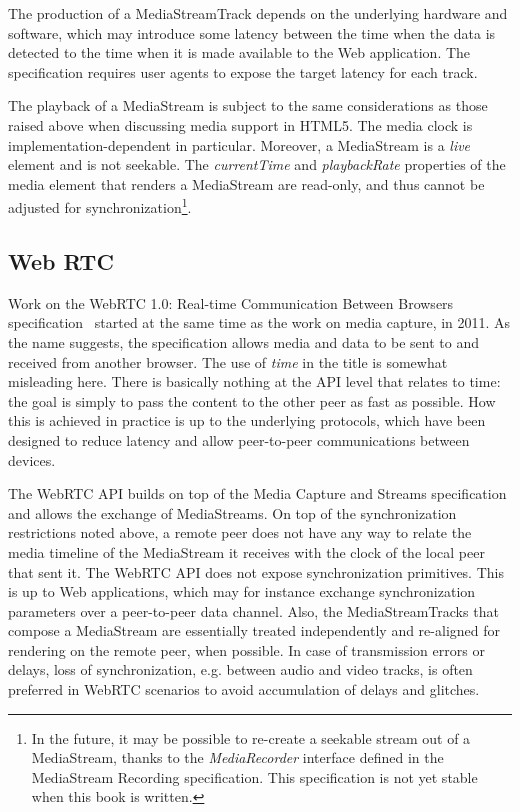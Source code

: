 The production of a MediaStreamTrack depends on the underlying hardware and
software, which may introduce some latency between the time when the data is
detected to the time when it is made available to the Web application. The
specification requires user agents to expose the target latency for each
track.

The playback of a MediaStream is subject to the same considerations as those
raised above when discussing media support in HTML5. The media clock is
implementation-dependent in particular. Moreover, a MediaStream is a
\emph{live} element and is not seekable. The \emph{currentTime} and
\emph{playbackRate} properties of the media element that renders a MediaStream
are read-only, and thus cannot be adjusted for synchronization\footnote{In the
future, it may be possible to re-create a seekable stream out of a
MediaStream, thanks to the \emph{MediaRecorder} interface defined in the
MediaStream Recording specification. This specification is not yet stable when
this book is written.}.


\subsection{Web RTC}
\label{sec:webrtc}

Work on the WebRTC 1.0: Real-time Communication Between Browsers
specification~\cite{webrtc}  started at the same time as the work on media
capture, in 2011. As the name suggests, the specification allows media and
data to be sent to and received from another browser. The use of \emph{time}
in the title is somewhat misleading here. There is basically nothing at the
API level that relates to time: the goal is simply to pass the content to the
other peer as fast as possible. How this is achieved in practice is up to the
underlying protocols, which have been designed to reduce latency and allow
peer-to-peer communications between devices.

The WebRTC API builds on top of the Media Capture and Streams specification
and allows the exchange of MediaStreams. On top of the synchronization
restrictions noted above, a remote peer does not have any way to relate the
media timeline of the MediaStream it receives with the clock of the local
peer that sent it. The WebRTC API does not expose synchronization primitives.
This is up to Web applications, which may for instance exchange
synchronization parameters over a peer-to-peer data channel. Also, the
MediaStreamTracks that compose a MediaStream are essentially treated
independently and re-aligned for rendering on the remote peer, when possible.
In case of transmission errors or delays, loss of synchronization, e.g.
between audio and video tracks, is often preferred in WebRTC scenarios to
avoid accumulation of delays and glitches.

